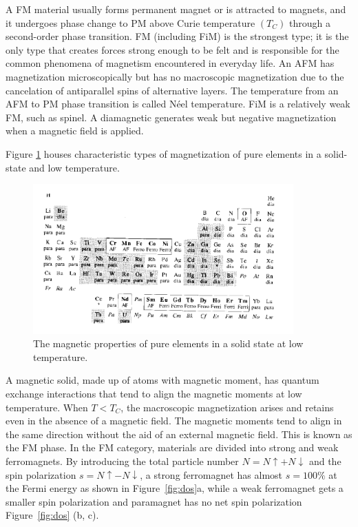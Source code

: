 A FM material usually forms permanent magnet or is attracted to magnets, and it undergoes phase change to PM above Curie temperature $(T_C)$ through a second-order phase transition.
FM (including FiM) is the strongest type; it is the only type that creates forces strong enough to be felt and is responsible for the common phenomena of magnetism encountered in everyday life.
An AFM has magnetization microscopically but has no macroscopic magnetization due to the cancelation of antiparallel spins of alternative layers. 
The temperature from an AFM to PM phase transition is called Néel temperature. FiM is a relatively weak FM, such as  spinel. A diamagnetic generates weak but negative magnetization when a magnetic field is applied. 

Figure \ref{fig:table2} houses characteristic types of magnetization of pure elements in a solid-state and low temperature.

\begin{figure}[H]
	\centering
	\includegraphics[width=100mm]{fig/review/tabel2.png}
	\caption[Magnetic properties of pure elements]{The magnetic properties of pure elements in a solid state at low temperature.}
	\label{fig:table2}
\end{figure}


A magnetic solid, made up of atoms with magnetic moment, has quantum exchange interactions that tend to align the magnetic moments at low temperature. When $T <T_C$, the macroscopic magnetization arises and retains even in the absence of a magnetic field. The magnetic moments tend to align in the same direction without the aid of an external magnetic field.
This is known as the FM phase.  In the FM category, materials are divided into strong and weak ferromagnets.
By introducing the total particle number $N=N\uparrow+N\downarrow$ and the spin polarization $s=N\uparrow-N\downarrow$, a strong ferromagnet has almost $s = 100\%$ at the Fermi energy as shown in Figure~\ref{fig:dos}a, while a weak ferromagnet gets a smaller spin polarization and paramagnet has no net spin polarization Figure~\ref{fig:dos}  (b, c).

